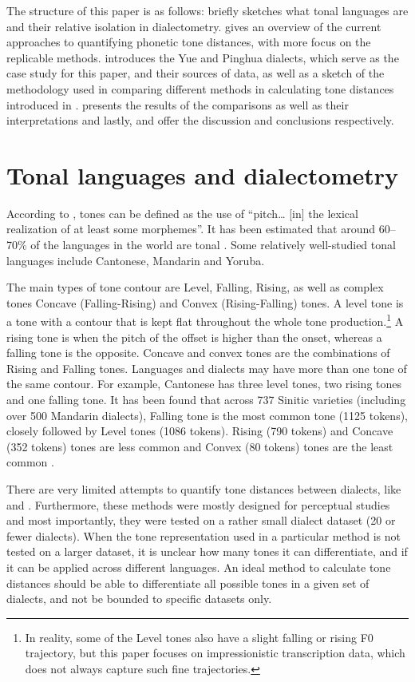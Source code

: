 \documentclass[output=paper, chinesefont]{langscibook}
\begin{document}
The structure of this paper is as follows:  briefly sketches what tonal languages are and their relative isolation in dialectometry.  gives an overview of the current approaches to quantifying phonetic tone distances, with more focus on the replicable methods.  introduces the Yue and Pinghua dialects, which serve as the case study for this paper, and their sources of data, as well as a sketch of the methodology used in comparing different methods in calculating tone distances introduced in .  presents the results of the comparisons as well as their interpretations and lastly,  and  offer the discussion and conclusions respectively.

\section{Tonal languages and dialectometry}
\label{sec:sung:2}
According to \citet[229]{Hyman2006}, tones can be defined as the use of “pitch… [in] the lexical realization of at least some morphemes”. It has been estimated that around 60--70\% of the languages in the world are tonal \citep[1]{Yip2002}. Some relatively well-studied tonal languages include Cantonese, Mandarin and Yoruba.

The main types of tone contour are Level, Falling, Rising, as well as complex tones Concave (Falling-Rising) and Convex (Rising-Falling) tones. A level tone is a tone with a contour that is kept flat throughout the whole tone production.\footnote{In reality, some of the Level tones also have a slight falling or rising F0 trajectory, but this paper focuses on impressionistic transcription data, which does not always capture such fine trajectories.}  A rising tone is when the pitch of the offset is higher than the onset, whereas a falling tone is the opposite. Concave and convex tones are the combinations of Rising and Falling tones. Languages and dialects may have more than one tone of the same contour. For example, Cantonese has three level tones, two rising tones and one falling tone. It has been found that across 737 Sinitic varieties (including over 500 Mandarin dialects), Falling tone is the most common tone (1125 tokens), closely followed by Level tones (1086 tokens). Rising (790 tokens) and Concave (352 tokens) tones are less common and Convex (80 tokens) tones are the least common \citep{Cheng1973}.

There are very limited attempts to quantify tone distances between dialects, like \citet{YangCastro2008} and \citet{Tang2009}. Furthermore, these methods were mostly designed for perceptual studies and most importantly, they were tested on a rather small dialect dataset (20 or fewer dialects). When the tone representation used in a particular method is not tested on a larger dataset, it is unclear how many tones it can differentiate, and if it can be applied across different languages. An ideal method to calculate tone distances should be able to differentiate all possible tones in a given set of dialects, and not be bounded to specific datasets only. 
\end{document}

